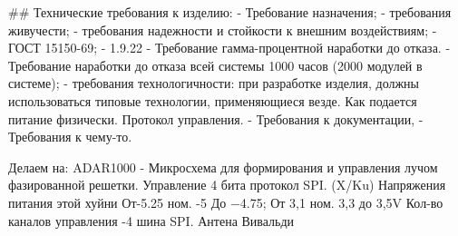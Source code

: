 

## Технические требования к изделию: 
- Требование назначения; 
- требования живучести;
- требования надежности и стойкости к внешним воздействиям;
	- ГОСТ 15150-69;
	- 1.9.22
	- Требование гамма-процентной наработки до отказа.
	- Требование наработки до отказа всей системы 1000 часов (2000 модулей в системе);
- требования технологичности: при разработке изделия, должны использоваться типовые технологии, применяющиеся везде. Как подается питание физически. Протокол управления.
- Требования к документации,
- Требования к чему-то.


Делаем на:
ADAR1000 - Микросхема для формирования и управления лучом фазированной решетки. Управление 4 бита протокол SPI. (X/Ku)
Напряжения питания этой хуйни От-5.25 ном. -5 До −4.75;  От 3,1 ном. 3,3 до 3,5V Кол-во каналов управления -4 шина SPI.
Антена Вивальди

